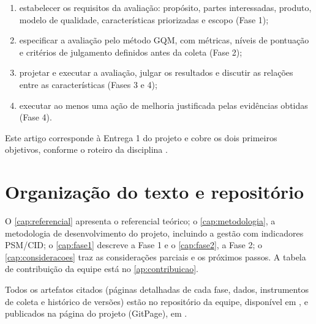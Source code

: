 \begin{enumerate}
	\item estabelecer os requisitos da avaliação: propósito, partes interessadas, produto, modelo de qualidade, características priorizadas e escopo (Fase 1);
	\item especificar a avaliação pelo método GQM, com métricas, níveis de pontuação e critérios de julgamento definidos antes da coleta (Fase 2);
	\item projetar e executar a avaliação, julgar os resultados e discutir as relações entre as características (Fases 3 e 4);
	\item executar ao menos uma ação de melhoria justificada pelas evidências obtidas (Fase 4).
\end{enumerate}

Este artigo corresponde à Entrega 1 do projeto e cobre os dois primeiros objetivos, conforme o roteiro da disciplina \cite{ramos2026roteiro}.

\section{Organização do texto e repositório}
\label{sec:organizacao}

O \autoref{cap:referencial} apresenta o referencial teórico; o \autoref{cap:metodologia}, a metodologia de desenvolvimento do projeto, incluindo a gestão com indicadores PSM/CID; o \autoref{cap:fase1} descreve a Fase 1 e o \autoref{cap:fase2}, a Fase 2; o \autoref{cap:consideracoes} traz as considerações parciais e os próximos passos. A tabela de contribuição da equipe está no \autoref{ap:contribuicao}.

Todos os artefatos citados (páginas detalhadas de cada fase, dados, instrumentos de coleta e histórico de versões) estão no repositório da equipe, disponível em \urlrepositorio, e publicados na página do projeto (GitPage), em \urlgitpage.
